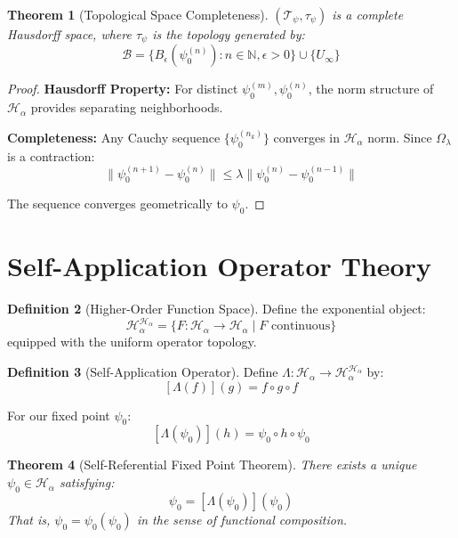 \documentclass[12pt]{article}
\theoremstyle{plain}
\newtheorem{theorem}{Theorem}[section]
\theoremstyle{definition}
\newtheorem{definition}[theorem]{Definition}
\begin{document}
\begin{theorem}[Topological Space Completeness]
\label{thm:topology-complete}
$(\mathcal{T}_\psi, \tau_\psi)$ is a complete Hausdorff space, where $\tau_\psi$ is the topology generated by:
$$\mathcal{B} = \{B_\epsilon(\psi_0^{(n)}) : n \in \mathbb{N}, \epsilon > 0\} \cup \{U_\infty\}$$
\end{theorem}

\begin{proof}
\textbf{Hausdorff Property:} For distinct $\psi_0^{(m)}, \psi_0^{(n)}$, the norm structure of $\mathcal{H}_\alpha$ provides separating neighborhoods.

\textbf{Completeness:} Any Cauchy sequence $\{\psi_0^{(n_k)}\}$ converges in $\mathcal{H}_\alpha$ norm. Since $\Omega_\lambda$ is a contraction:
$$\|\psi_0^{(n+1)} - \psi_0^{(n)}\| \leq \lambda \|\psi_0^{(n)} - \psi_0^{(n-1)}\|$$

The sequence converges geometrically to $\psi_0$.
\end{proof}

\section{Self-Application Operator Theory}

\begin{definition}[Higher-Order Function Space]
Define the exponential object:
$$\mathcal{H}_\alpha^{\mathcal{H}_\alpha} = \{F: \mathcal{H}_\alpha \to \mathcal{H}_\alpha \mid F \text{ continuous}\}$$
equipped with the uniform operator topology.
\end{definition}

\begin{definition}[Self-Application Operator]
Define $\Lambda: \mathcal{H}_\alpha \to \mathcal{H}_\alpha^{\mathcal{H}_\alpha}$ by:
$$[\Lambda(f)](g) = f \circ g \circ f$$

For our fixed point $\psi_0$:
$$[\Lambda(\psi_0)](h) = \psi_0 \circ h \circ \psi_0$$
\end{definition}

\begin{theorem}[Self-Referential Fixed Point Theorem]
\label{thm:self-reference}
There exists a unique $\psi_0 \in \mathcal{H}_\alpha$ satisfying:
$$\psi_0 = [\Lambda(\psi_0)](\psi_0)$$
That is, $\psi_0 = \psi_0(\psi_0)$ in the sense of functional composition.
\end{theorem}
\end{document}
